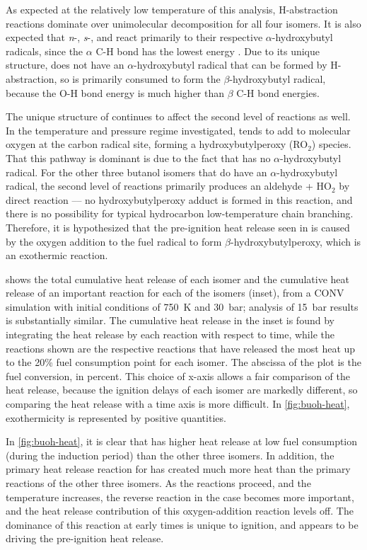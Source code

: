\documentclass[12pt, letterpaper]{article}
\begin{document}
As expected at the relatively low temperature of this analysis, H-abstraction
reactions dominate over unimolecular decomposition for all four isomers. It is
also expected that \textit{n}-, \textit{s}-, and \iBuOH{} react
primarily to their respective $\alpha$-hydroxybutyl radicals, since the
$\alpha$ C-H bond has the lowest energy \cite{Sarathy2012}. Due to its unique
structure, \tBuOH{} does not have an $\alpha$-hydroxybutyl radical
that can be formed by H-abstraction, so \tBuOH{} is primarily
consumed to form the $\beta$-hydroxybutyl radical, because the O-H bond energy
is much higher than $\beta$ C-H bond energies.

The unique structure of \tBuOH{} continues to affect the second level
of reactions as well. In the temperature and pressure regime investigated,
\tBuOH{} tends to add to molecular oxygen at the carbon radical site,
forming a hydroxybutylperoxy (RO$_2$) species. That this pathway is dominant is
due to the fact that \tBuOH{} has no $\alpha$-hydroxybutyl radical.
For the other three butanol isomers that do have an $\alpha$-hydroxybutyl
radical, the second level of reactions primarily produces an aldehyde + HO$_2$
by direct reaction –-- no hydroxybutylperoxy adduct is formed in this reaction,
and there is no possibility for typical hydrocarbon low-temperature chain
branching. Therefore, it is hypothesized that the pre-ignition heat release
seen in \tBuOH{} is caused by the oxygen addition to the fuel radical
to form $\beta$-hydroxybutylperoxy, which is an exothermic reaction.

 shows the total cumulative heat release of each isomer
and the cumulative heat release of an important reaction for each of the
isomers (inset), from a CONV simulation with initial conditions of \SI{750}{\kelvin} and
\SI{30}{\bar}; analysis of \SI{15}{\bar} results is substantially similar. The cumulative heat
release in the inset is found by integrating the heat release by each reaction
with respect to time, while the reactions shown are the respective reactions
that have released the most heat up to the 20\% fuel consumption point for each
isomer. The abscissa of the plot is the fuel conversion, in percent. This
choice of x-axis allows a fair comparison of the heat release, because the
ignition delays of each isomer are markedly different, so comparing the heat
release with a time axis is more difficult. In \autoref{fig:buoh-heat},
exothermicity is represented by positive quantities.

In \autoref{fig:buoh-heat}, it is clear that \tBuOH{} has higher
heat release at low fuel consumption (during the induction period) than the
other three isomers. In addition, the primary heat release reaction for
\tBuOH{} has created much more heat than the primary reactions of the
other three isomers. As the reactions proceed, and the temperature increases,
the reverse reaction in the \tBuOH{} case becomes more important, and
the heat release contribution of this oxygen-addition reaction levels off. The
dominance of this reaction at early times is unique to \tBuOH{}
ignition, and appears to be driving the pre-ignition heat release.
\end{document}
